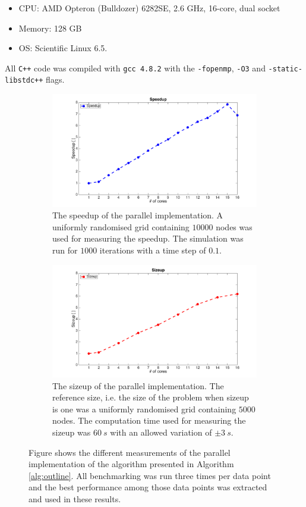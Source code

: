 \begin{itemize}
\item CPU: AMD Opteron (Bulldozer) 6282SE, 2.6 GHz, 16-core, dual socket
\item Memory: 128 GB
\item OS: Scientific Linux 6.5.
\end{itemize}

\noindent All \texttt{C++} code was compiled with \texttt{gcc 4.8.2} with the \texttt{-fopenmp}, \texttt{-O3} and  \texttt{-static-libstdc++} flags.

\begin{figure}
\centering
\begin{subfigure}[b]{1\textwidth}
\includegraphics[width=\textwidth, height=0.5\textwidth]{img/speedup.png}
\caption{The speedup of the parallel implementation. A uniformly randomised grid containing $10000$ nodes was used for measuring the speedup. The simulation was run for $1000$ iterations with a time step of $0.1$.}
\end{subfigure}

\begin{subfigure}[b]{1\textwidth}
\includegraphics[width=\textwidth, height=0.5\textwidth]{img/sizeup.png}
\caption{The sizeup of the parallel implementation. The reference size, i.e. the size of the problem when sizeup is one was a uniformly randomised grid containing $5000$ nodes. The computation time used for measuring the sizeup was $60~s$ with an allowed variation of $\pm 3~s$. }
\end{subfigure}
\caption{Figure shows the different measurements of the parallel implementation of the algorithm presented in Algorithm \ref{alg:outline}. All benchmarking was run three times per data point and the best performance among those data points was extracted and used in these results.}
\label{fig:speed_size}
\end{figure}

